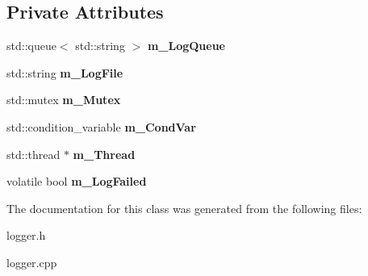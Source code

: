 \subsection*{Private Attributes}
\begin{DoxyCompactItemize}
\item 
\hypertarget{classengine_1_1cLogger_a7b8b091c96a450cd797a082d6b62eebe}{std\-::queue$<$ std\-::string $>$ {\bfseries m\-\_\-\-Log\-Queue}}\label{classengine_1_1cLogger_a7b8b091c96a450cd797a082d6b62eebe}

\item 
\hypertarget{classengine_1_1cLogger_a5ed7f5ea359f12a3bc10a94946e014aa}{std\-::string {\bfseries m\-\_\-\-Log\-File}}\label{classengine_1_1cLogger_a5ed7f5ea359f12a3bc10a94946e014aa}

\item 
\hypertarget{classengine_1_1cLogger_a3f907ab4de66ae473edac44e6a70f04e}{std\-::mutex {\bfseries m\-\_\-\-Mutex}}\label{classengine_1_1cLogger_a3f907ab4de66ae473edac44e6a70f04e}

\item 
\hypertarget{classengine_1_1cLogger_a760b3b65f9a38de98aa263010e43849e}{std\-::condition\-\_\-variable {\bfseries m\-\_\-\-Cond\-Var}}\label{classengine_1_1cLogger_a760b3b65f9a38de98aa263010e43849e}

\item 
\hypertarget{classengine_1_1cLogger_ad9d1a17a73611f65fbcb1ca0cdcfdc21}{std\-::thread $\ast$ {\bfseries m\-\_\-\-Thread}}\label{classengine_1_1cLogger_ad9d1a17a73611f65fbcb1ca0cdcfdc21}

\item 
\hypertarget{classengine_1_1cLogger_a504642ec8729a8917413dea7639698b4}{volatile bool {\bfseries m\-\_\-\-Log\-Failed}}\label{classengine_1_1cLogger_a504642ec8729a8917413dea7639698b4}

\end{DoxyCompactItemize}


The documentation for this class was generated from the following files\-:\begin{DoxyCompactItemize}
\item 
logger.\-h\item 
logger.\-cpp\end{DoxyCompactItemize}
